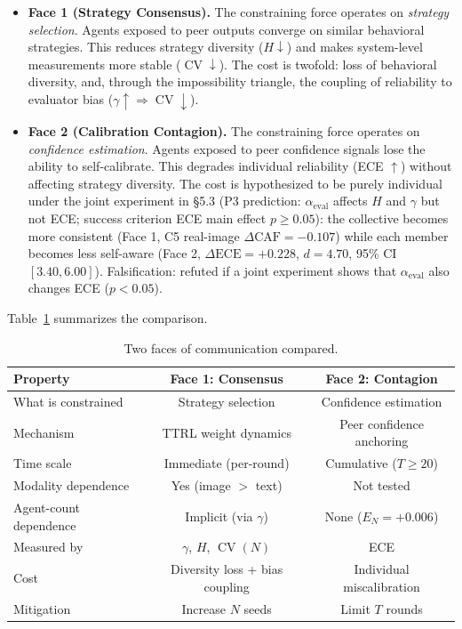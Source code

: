 \documentclass[11pt]{article}
\DeclareMathOperator{\CV}{CV}
\begin{document}
\begin{itemize}[leftmargin=*,nosep]
 \item \textbf{Face 1 (Strategy Consensus).} The constraining force operates on \textit{strategy selection}. Agents exposed to peer outputs converge on similar behavioral strategies. This reduces strategy diversity ($H \downarrow$) and makes system-level measurements more stable ($\CV \downarrow$). The cost is twofold: loss of behavioral diversity, and, through the impossibility triangle, the coupling of reliability to evaluator bias ($\gamma \uparrow \Rightarrow \CV \downarrow$).
 \item \textbf{Face 2 (Calibration Contagion).} The constraining force operates on \textit{confidence estimation}. Agents exposed to peer confidence signals lose the ability to self-calibrate. This degrades individual reliability (ECE $\uparrow$) without affecting strategy diversity. The cost is hypothesized to be purely individual under the joint experiment in §5.3 (P3 prediction: $\alpha_{\text{eval}}$ affects $H$ and $\gamma$ but not ECE; success criterion ECE main effect $p \geq 0.05$): the collective becomes more consistent (Face 1, C5 real-image $\Delta\text{CAF} = -0.107$) while each member becomes less self-aware (Face 2, $\Delta\text{ECE} = +0.228$, $d = 4.70$, 95\% CI $[3.40, 6.00]$). Falsification: refuted if a joint experiment shows that $\alpha_{\text{eval}}$ also changes ECE ($p < 0.05$).
\end{itemize}

Table~\ref{tab:comparison} summarizes the comparison.

\begin{table}[H]
\centering
\caption{Two faces of communication compared.}
\label{tab:comparison}
\begin{tabular}{@{}lcc@{}}
\toprule
\textbf{Property} & \textbf{Face 1: Consensus} & \textbf{Face 2: Contagion} \\
\midrule
What is constrained  & Strategy selection & Confidence estimation \\
Mechanism            & TTRL weight dynamics & Peer confidence anchoring \\
Time scale           & Immediate (per-round) & Cumulative ($T \geq 20$) \\
Modality dependence  & Yes (image $>$ text) & Not tested \\
Agent-count dependence & Implicit (via $\gamma$) & None ($E_N = +0.006$) \\
Measured by          & $\gamma$, $H$, $\CV(N)$ & ECE \\
Cost                 & Diversity loss + bias coupling & Individual miscalibration \\
Mitigation           & Increase $N$ seeds & Limit $T$ rounds \\
\bottomrule
\end{tabular}
\end{table}
\end{document}
